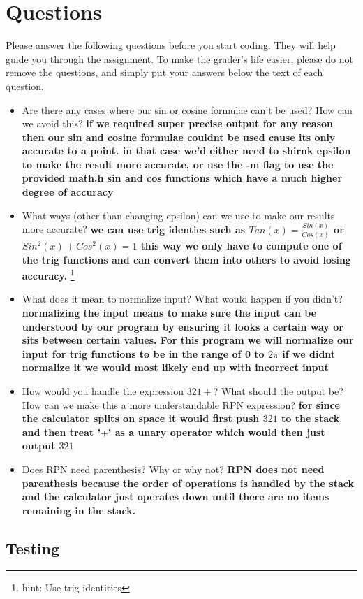 \documentclass{article}
\begin{document}
\section*{Questions}
Please answer the following questions before you start coding. They will help guide you through the assignment. To make the grader's life easier, please do not remove the questions, and simply put your answers below the text of each question. 
\begin{itemize}
    \item Are there any cases where our sin or cosine formulae can't be used? How can we avoid this? \textbf{if we required super precise output for any reason then our sin and cosine formulae couldnt be used cause its only accurate to a point. in that case we'd either need to shirnk epsilon to make the result more accurate, or use the -m flag to use the provided math.h sin and cos functions which have a much higher degree of accuracy }
    \item What ways (other than changing epsilon) can we use to make our results more accurate? \textbf{we can use trig identies such as $Tan(x)=\frac{Sin(x)}{Cos(x)}$ or $Sin^2(x) + Cos^2(x) = 1$ this way we only have to compute one of the trig functions and can convert them into others to avoid losing accuracy.} \footnote{hint: Use trig identities}
    \item What does it mean to normalize input? What would happen if you didn't? \textbf{normalizing the input means to make sure the input can be understood by our program by ensuring it looks a certain way or sits between certain values. For this program we will normalize our input for trig functions to be in the range of 0 to $2\pi$ if we didnt normalize it we would most likely end up with incorrect input}
    \item How would you handle the expression $3 2 1 +$? What should the output be? How can we make this a more understandable RPN expression? \textbf{for since the calculator splits on space it would first push $321$ to the stack and then treat '$+$' as a unary operator which would then just output $321$ }
    \item Does RPN need parenthesis? Why or why not? \textbf{RPN does not need parenthesis because the order of operations is handled by the stack and the calculator just operates down until there are no items remaining in the stack.}
    
\end{itemize}


\subsection*{Testing}
\end{document}
